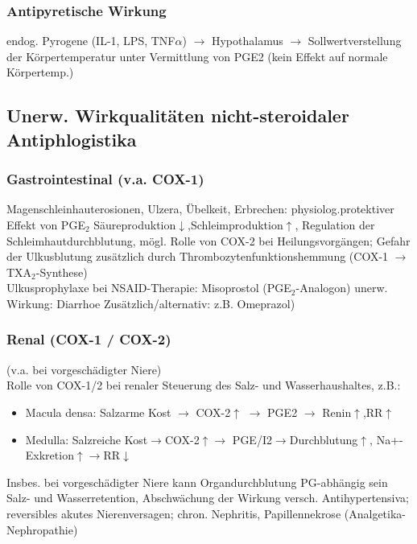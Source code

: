 \documentclass[10pt,a4paper]{report}
\begin{document}
\subsubsection{Antipyretische Wirkung} %
\label{par:antipyretische_wirkung}
endog. Pyrogene (IL-1, LPS, TNF$\alpha$) $\rightarrow$ Hypothalamus $\rightarrow$ Sollwertverstellung der Körpertemperatur unter Vermittlung von PGE2 (kein Effekt auf normale Körpertemp.) 
\subsection{Unerw. Wirkqualitäten nicht-steroidaler Antiphlogistika} %
\label{ssub:unerw_wirkqualit_ten_nicht_steroidaler_antiphlogistika}
\subsubsection{Gastrointestinal (v.a. COX-1)} %
\label{par:gastrointestinal_v_a_cox_1_}
Magenschleinhauterosionen, Ulzera, Übelkeit, Erbrechen: physiolog.protektiver Effekt von PGE$_2$ Säureproduktion$\downarrow$,Schleimproduktion$\uparrow$, Regulation der Schleimhautdurchblutung, mögl. Rolle von COX-2 bei Heilungsvorgängen; Gefahr der Ulkusblutung zusätzlich durch Thrombozytenfunktionshemmung (COX-1 $\rightarrow$ TXA$_2$-Synthese)\\
Ulkusprophylaxe bei NSAID-Therapie: Misoprostol (PGE$_2$-Analogon) unerw. Wirkung: Diarrhoe Zusätzlich/alternativ: z.B. Omeprazol)
\subsubsection{Renal  (COX-1 / COX-2)} %
\label{par:renal_cox_1_cox_2_}
(v.a. bei vorgeschädigter Niere)\\
Rolle von COX-1/2 bei renaler Steuerung des Salz- und Wasserhaushaltes, z.B.:
\begin{itemize}
	\item Macula densa: Salzarme Kost $\rightarrow$ COX-2$\uparrow$ $\rightarrow$ PGE2 $\rightarrow$ Renin$\uparrow$,RR$\uparrow$
	\item Medulla: Salzreiche Kost$\rightarrow$COX-2$\uparrow$$\rightarrow$ PGE/I2$\rightarrow$Durchblutung$\uparrow$, Na+-Exkretion$\uparrow$$\rightarrow$RR$\downarrow$
\end{itemize}
Insbes. bei vorgeschädigter Niere kann Organdurchblutung PG-abhängig sein Salz- und Wasserretention, Abschwächung der Wirkung versch. Antihypertensiva; reversibles akutes Nierenversagen; chron. Nephritis, Papillennekrose (Analgetika-Nephropathie)
\end{document}
